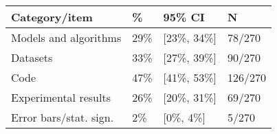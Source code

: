 \begin{tabular}{llll}
\hline
Category/item & \% & 95\% CI  & N \\
\hline
Models and algorithms & 29\% & [23\%, 34\%] & 78/270\\
Datasets & 33\% & [27\%, 39\%] & 90/270\\
Code & 47\% & [41\%, 53\%] & 126/270\\
Experimental results & 26\% & [20\%, 31\%] & 69/270\\
Error bars/stat. sign.& 2\% & [0\%, 4\%] & 5/270\\
\hline
\end{tabular}
